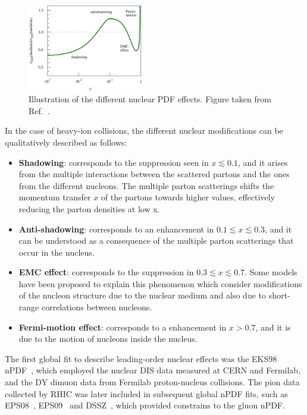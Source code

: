 \begin{figure}[!htb]
 \centering
 \includegraphics[width=0.45\textwidth]{Figures/WBoson/Theory/NuclearPDF.png}
 \caption{Illustration of the different nuclear PDF effects. Figure taken from Ref.~\cite{NuclearPDFIllus}.}
 \label{fig:NuclearPDFs}
\end{figure}

In the case of heavy-ion collisions, the different nuclear modifications can be qualitatively described as follows:

\begin{itemize}
 \item \textbf{Shadowing}: corresponds to the suppression seen in $x \lesssim 0.1$, and it arises from the multiple interactions between the scattered partons and the ones from the different nucleons. The multiple parton scatterings shifts the momentum transfer $x$ of the partons towards higher values, effectively reducing the parton densities at low x.
 \item \textbf{Anti-shadowing}: corresponds to an enhancement in $0.1 \lesssim x \lesssim 0.3$, and it can be understood as a consequence of the multiple parton scatterings that occur in the nucleus.
 \item \textbf{EMC effect}: corresponds to the suppression in $0.3 \lesssim x \lesssim 0.7$. Some models have been proposed to explain this phenomenon which consider modifications of the nucleon structure due to the nuclear medium and also due to short-range correlations between nucleons.
 \item \textbf{Fermi-motion effect}: corresponds to a enhancement in $x > 0.7$, and it is due to the motion of nucleons inside the nucleus.
\end{itemize}

The first global fit to describe leading-order nuclear effects was the EKS98 nPDF~\cite{EKS98}, which employed the nuclear DIS data measured at CERN and Fermilab, and the DY dimuon data from Fermilab proton-nucleus collisions. The pion data collected by RHIC was later included in subsequent global nPDF fits, such as EPS08~\cite{EPS08}, EPS09~\cite{EPS09} and DSSZ~\cite{DSSZ}, which provided constrains to the gluon nPDF.

